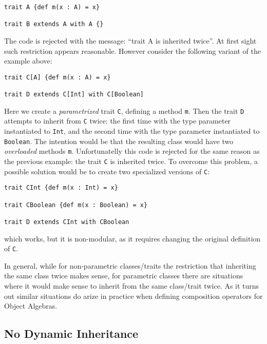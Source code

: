 \begin{lstlisting}
trait A {def m(x : A) = x}

trait B extends A with A {}
\end{lstlisting}

\noindent The code is rejected with the message: ``trait A is
inherited twice''. At first sight such restriction appears
reasonable. However consider the following variant of the example 
above:

\begin{lstlisting}
trait C[A] {def m(x : A) = x}
	
trait D extends C[Int] with C[Boolean]
\end{lstlisting}

\noindent Here we create a \emph{parametrized} trait \lstinline{C}, 
defining a method \lstinline{m}. Then the trait \lstinline{D} attempts 
to inherit from \lstinline{C} twice: the first time with the type
parameter instantiated to \lstinline{Int}, and the second time with
the type parameter instantiated to \lstinline{Boolean}. The intention 
would be that the resulting class would have two \emph{overloaded}
methods \lstinline{m}. Unfortunatelly this code is rejected for the
same reason as the previous example: the trait \lstinline{C} is
inherited twice. To overcome this problem, a possible solution would
be to create two specialized versions of \lstinline{C}:

\begin{lstlisting}
trait CInt {def m(x : Int) = x}

trait CBoolean {def m(x : Boolean) = x}
	
trait D extends CInt with CBoolean
\end{lstlisting}

\noindent which works, but it is non-modular, as it requires changing 
the original definition of \lstinline{C}. 

In general, while for non-parametric classes/traits the restriction
that inheriting the same class twice makes sense, for parametric
classes there are situations where it would make sense to inherit 
from the same class/trait twice. As it turns out similar situations 
do arize in practice when defining composition operators for 
Object Algebras. 

\subsection{No Dynamic Inheritance}


